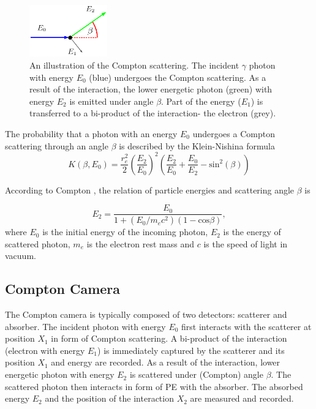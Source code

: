 \begin{figure}[!h]
    \centering
    \includegraphics[width=0.3\textwidth]{./fig/photos/compton_simple.eps}
    \caption{An illustration of the Compton scattering. The incident $\gamma$ photon with energy $E_{0}$ (blue) undergoes the Compton scattering. As a result of the interaction, the lower energetic photon (green) with energy $E_{2}$ is emitted under angle $\beta$. Part of the energy ($E_{1}$) is transferred to a bi-product of the interaction- the electron (grey).}
    \label{fig:scattering}
\end{figure}
The probability that a photon with an energy $E_{0}$ undergoes a Compton scattering through an angle $\beta$ is described by the Klein-Nishina formula
\begin{equation}
  K(\beta, E_{0}) = \frac{r_{e}^{2}}{2} \left( \frac{E_{2}}{E_{0}}  \right)^{2} \left(  \frac{E_{2}}{E_{0}} + \frac{E_{0}}{E_{2}} - \mathrm{sin}^{2}(\beta)  \right)
  \label{eq:klein_nishina}
\end{equation}


According to Compton \cite{compton}, the relation of particle energies and scattering angle $\beta$ is

\begin{equation}
E_{2} = \frac{E_{0}}{  1 + (E_{0} / m_{e}c^{2}) (1 - \mathrm{cos} \beta)},
\end{equation}
where $E_{0}$ is the initial energy of the incoming photon, $E_{2}$ is the energy of scattered photon,  $m_{e}$ is the electron rest mass and $c$ is the speed of light in vacuum. 



\subsection{Compton Camera}%
The Compton camera is typically composed of two detectors: scatterer and absorber.
The incident photon with energy $E_{0}$ first interacts with the scatterer at position $X_{1}$ in form of Compton scattering.
A bi-product of the interaction (electron with energy $E_{1}$) is immediately captured by the scatterer and its position $X_{1}$ and energy are recorded.
As a result of the interaction, lower energetic photon with energy $E_{2}$ is scattered under (Compton) angle $\beta$.
The scattered photon then interacts in form of \ac{PE} with the absorber.
The absorbed energy $E_{2}$ and the position of the interaction $X_{2}$ are measured and recorded.

